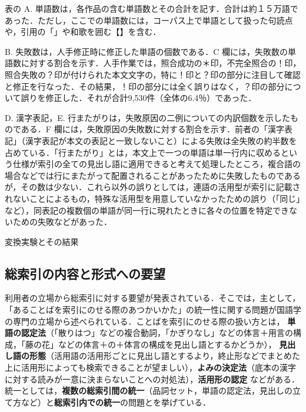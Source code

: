 表の A. 単語数は，各作品の含む単語数とその合計を記す．合計は約１５万語であった．ただし，ここでの単語数には，コーパス上で単語として扱った句読点や，引用の「」や和歌を囲む【】を含む．

 B. 失敗数は，人手修正時に修正した単語の個数である．C 欄には，失敗数の単語数に対する割合を示す．人手作業では，照合成功の＊印，不完全照合の！印，照合失敗の？印が付けられた本文文字の，特に！印と？印の部分に注目して確認と修正を行なった．その結果，！印の部分には全く誤りはなく，？印の部分について誤りを修正した．それが合計9,530件（全体の6.4％）であった．
 
 D. 漢字表記，E. 行またがりは，失敗原因の二例についての内訳個数を示したものである．F 欄には，失敗原因の失敗数に対する割合を示す．前者の「漢字表記」（漢字表記が本文の表記と一致しないこと）による失敗は全失敗の約半数を占めている．「行またがり」とは，本文上で一つの単語は単一行内に収めるという仕様が索引の全ての見出し語に適用できると考えて処理したところ，複合語の場合などでは行にまたがって配置されることがあったために失敗したものであるが，その数は少ない．これら以外の誤りとしては，連語の活用型が索引に記載されないことによるもの，特殊な活用型を用意していなかったための誤り（「同じ」など），同表記の複数個の単語が同一行に現れたときに各々の位置を特定できないための失敗などがあった．


\begin{table}[tb]
\begin{center}
\caption{変換実験とその結果}
\end{center}
\label{TAB1}
\end{table}

\subsection{総索引の内容と形式への要望}
\label{sec:request}
利用者の立場から総索引に対する要望が発表されている\cite{Miyajima1969}．そこでは，主として，「あることばを索引にのせる際のあつかいかた」の統一性に関する問題が国語学の専門の立場から述べられている．ことばを索引にのせる際の扱い方とは，
{\bf 単語の認定法}（「散りはつ」などの複合動詞，「かぎりなし」などの体言＋用言の構成，「藤の花」などの体言＋の＋体言の構成を見出し語とするかどうか），
{\bf 見出し語の形態}（活用語の活用形ごとに見出し語とするより，終止形などでまとめた上に活用形によっても検索できることが望ましい），{\bf よみの決定法}（底本の漢字に対する読みが一意に決まらないことへの対処法），{\bf 活用形の認定}
などがある．統一としては，{\bf 複数の総索引間の統一}（品詞セット，単語の認定法，見出しの立て方など）と{\bf 総索引内での統一}の問題とを挙げている．

